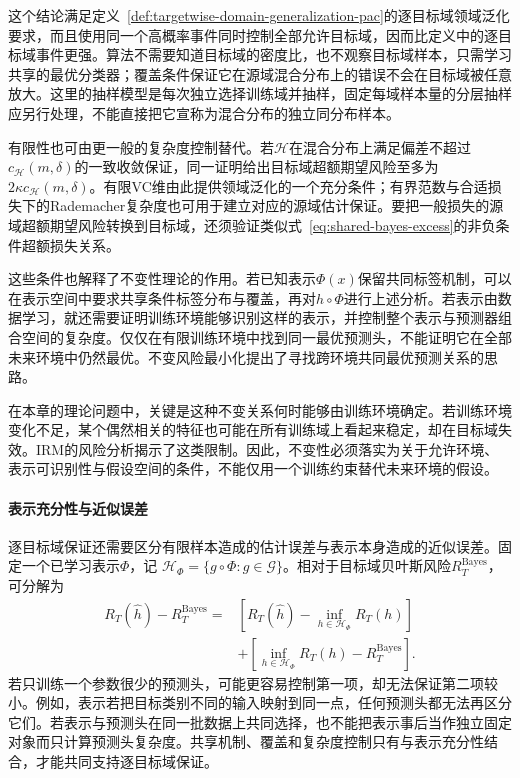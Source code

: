 这个结论满足定义~\ref{def:targetwise-domain-generalization-pac}的逐目标域领域泛化要求，而且使用同一个高概率事件同时控制全部允许目标域，因而比定义中的逐目标域事件更强。算法不需要知道目标域的密度比，也不观察目标域样本，只需学习共享的最优分类器；覆盖条件保证它在源域混合分布上的错误不会在目标域被任意放大。这里的抽样模型是每次独立选择训练域并抽样，固定每域样本量的分层抽样应另行处理，不能直接把它宣称为混合分布的独立同分布样本。

有限性也可由更一般的复杂度控制替代。若$\mathcal H$在混合分布上满足偏差不超过$c_{\mathcal H}(m,\delta)$的一致收敛保证，同一证明给出目标域超额期望风险至多为$2\kappa c_{\mathcal H}(m,\delta)$。有限VC维由此提供领域泛化的一个充分条件；有界范数与合适损失下的Rademacher复杂度也可用于建立对应的源域估计保证。要把一般损失的源域超额期望风险转换到目标域，还须验证类似式~\eqref{eq:shared-bayes-excess}的非负条件超额损失关系。

这些条件也解释了不变性理论的作用。若已知表示$\Phi(x)$保留共同标签机制，可以在表示空间中要求共享条件标签分布与覆盖，再对$h\circ\Phi$进行上述分析。若表示由数据学习，就还需要证明训练环境能够识别这样的表示，并控制整个表示与预测器组合空间的复杂度。仅仅在有限训练环境中找到同一最优预测头，不能证明它在全部未来环境中仍然最优。不变风险最小化提出了寻找跨环境共同最优预测关系的思路。

在本章的理论问题中，关键是这种不变关系何时能够由训练环境确定。若训练环境变化不足，某个偶然相关的特征也可能在所有训练域上看起来稳定，却在目标域失效。IRM的风险分析揭示了这类限制。因此，不变性必须落实为关于允许环境、表示可识别性与假设空间的条件，不能仅用一个训练约束替代未来环境的假设。

\paragraph{表示充分性与近似误差}

逐目标域保证还需要区分有限样本造成的估计误差与表示本身造成的近似误差。固定一个已学习表示$\Phi$，记
$\mathcal H_\Phi=\{g\circ\Phi:g\in\mathcal G\}$。相对于目标域贝叶斯风险$R_T^{\mathrm{Bayes}}$，可分解为
\begin{equation}
 \begin{aligned}
 R_T(\widehat h)-R_T^{\mathrm{Bayes}}
 ={}&\left[R_T(\widehat h)-\inf_{h\in\mathcal H_\Phi}R_T(h)\right]\\
 &+\left[\inf_{h\in\mathcal H_\Phi}R_T(h)-R_T^{\mathrm{Bayes}}\right].
 \end{aligned}
 \label{eq:transfer-representation-bias}
\end{equation}
若只训练一个参数很少的预测头，可能更容易控制第一项，却无法保证第二项较小。例如，表示若把目标类别不同的输入映射到同一点，任何预测头都无法再区分它们。若表示与预测头在同一批数据上共同选择，也不能把表示事后当作独立固定对象而只计算预测头复杂度。共享机制、覆盖和复杂度控制只有与表示充分性结合，才能共同支持逐目标域保证。

